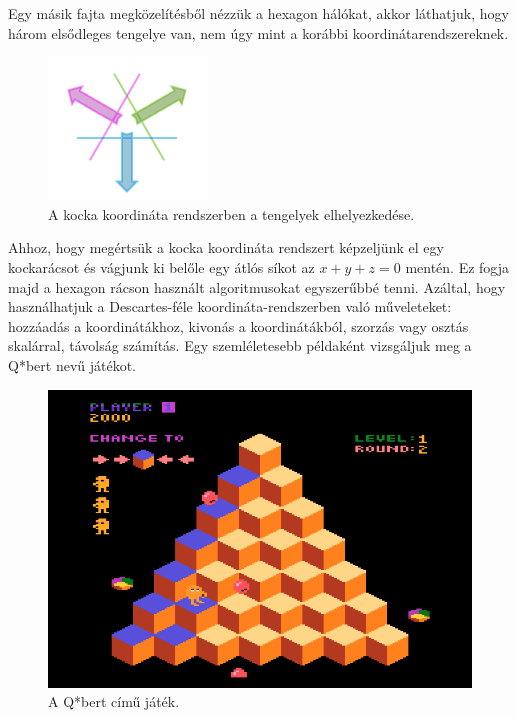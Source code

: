 Egy másik fajta megközelítésből nézzük a hexagon hálókat, akkor láthatjuk, hogy három elsődleges tengelye van, nem úgy mint a korábbi koordinátarendszereknek. 

\begin{figure}[h]
\centering
\includegraphics[scale=0.3]{kepek/img43.png}
\caption{A kocka koordináta rendszerben a tengelyek elhelyezkedése.}
\label{fig:img43}
\end{figure}

\noindent Ahhoz, hogy megértsük a kocka koordináta rendszert képzeljünk el egy kockarácsot és vágjunk ki belőle egy átlós síkot az $x + y + z = 0$ mentén. Ez fogja majd a hexagon rácson használt algoritmusokat egyszerűbbé tenni. Azáltal, hogy használhatjuk a Descartes-féle koordináta-rendszerben való műveleteket: hozzáadás a koordinátákhoz, kivonás a koordinátákból, szorzás vagy osztás skalárral, távolság számítás.
\newline
\newline Egy szemléletesebb példaként vizsgáljuk meg a Q*bert nevű játékot.

\begin{figure}[h]
\centering
\includegraphics[scale=0.3]{kepek/img44.png}
\caption{A Q*bert című játék.}
\label{fig:img44}
\end{figure}

